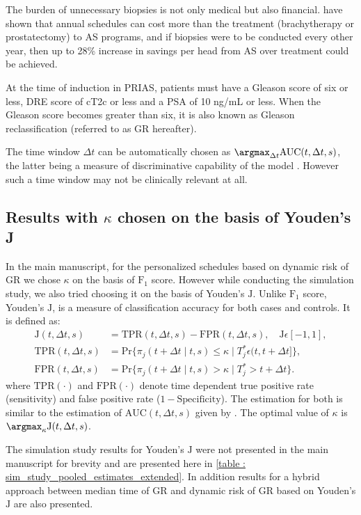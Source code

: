 The burden of unnecessary biopsies is not only medical but also financial. \citet{keegan2012active} have shown that annual schedules can cost more than the treatment (brachytherapy or prostatectomy) to AS programs, and if biopsies were to be conducted every other year, then up to 28\% increase in savings per head from AS over treatment could be achieved.

At the time of induction in PRIAS, patients must have a Gleason score of six or less, DRE score of cT2c or less and a PSA of 10 ng/mL or less. When the Gleason score becomes greater than six, it is also known as Gleason reclassification (referred to as GR hereafter).

The time window $\Delta t$ can be automatically chosen as $\argmax_{\Delta t}\mbox{AUC}(t, \Delta t, s)$, the latter being a measure of discriminative capability of the model \citep{rizopoulosJMbayes,landmarking2017}. However such a time window may not be clinically relevant at all. 

\subsection{Results with $\kappa$ chosen on the basis of Youden's J}
In the main manuscript, for the personalized schedules based on dynamic risk of GR we chose $\kappa$ on the basis of $\mbox{F}_1$ score. However while conducting the simulation study, we also tried choosing it on the basis of Youden's $\mbox{J}$. Unlike $\mbox{F}_1$ score, Youden's $\mbox{J}$, is a measure of classification accuracy for both cases and controls. It is defined as:
\begin{align*}
\mbox{J}(t, \Delta t, s) &= \text{TPR}(t, \Delta t, s) - \text{FPR}(t, \Delta t, s), \quad \mbox{J}\epsilon [-1,1],\\
\text{TPR}(t, \Delta t, s) &= \mbox{Pr}\big\{\pi_j(t + \Delta t \mid t,s) \leq \kappa \mid T^*_j \epsilon (t, t + \Delta t]\big\},\\
\text{FPR}(t, \Delta t, s) &= \mbox{Pr}\big\{\pi_j(t + \Delta t \mid t,s) > \kappa \mid T^*_j > t + \Delta t \big\}.
\end{align*}
where $\mbox{TPR}(\cdot)$ and $\mbox{FPR}(\cdot)$ denote time dependent true positive rate (sensitivity) and false positive rate ($1 - \mbox{Specificity}$). The estimation for both is similar to the estimation of $\mbox{AUC}(t, \Delta t, s)$ given by \citet{landmarking2017}. The optimal value of $\kappa$ is $\argmax_{\kappa} \mbox{J}(t, \Delta t, s)$.

The simulation study results for Youden's $\mbox{J}$ were not presented in the main manuscript for brevity and are presented here in \ref{table : sim_study_pooled_estimates_extended}. In addition results for a hybrid approach between median time of GR and dynamic risk of GR based on Youden's $\mbox{J}$ are also presented. 

